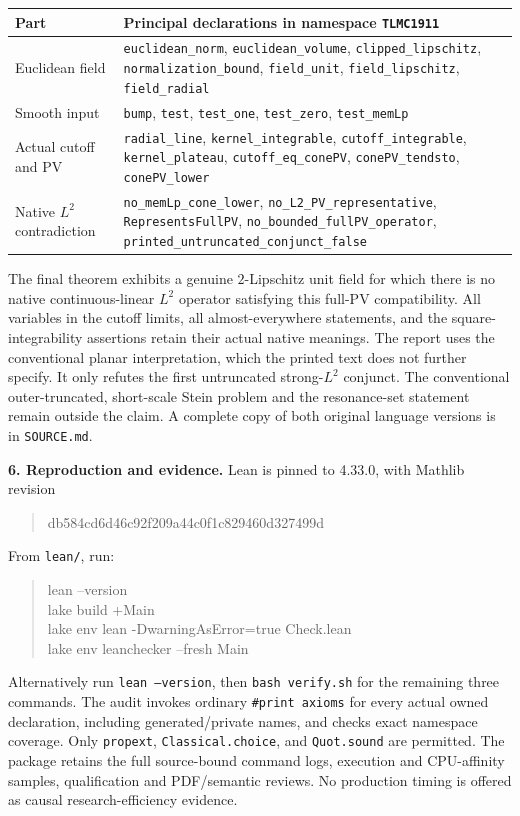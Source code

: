 \documentclass[10pt,a4paper]{article}
\begin{document}
\small
\begin{tabular}{@{}p{.28\linewidth}p{.67\linewidth}@{}}
\toprule
Part & Principal declarations in namespace \texttt{TLMC1911} \\
\midrule
Euclidean field & \texttt{euclidean\_norm}, \texttt{euclidean\_volume},
\texttt{clipped\_lipschitz}, \texttt{normalization\_bound},
\texttt{field\_unit}, \texttt{field\_lipschitz}, \texttt{field\_radial} \\
Smooth input & \texttt{bump}, \texttt{test}, \texttt{test\_one},
\texttt{test\_zero}, \texttt{test\_memLp} \\
Actual cutoff and PV & \texttt{radial\_line}, \texttt{kernel\_integrable},
\texttt{cutoff\_integrable}, \texttt{kernel\_plateau},
\texttt{cutoff\_eq\_conePV}, \texttt{conePV\_tendsto}, \texttt{conePV\_lower} \\
Native $L^2$ contradiction & \texttt{no\_memLp\_cone\_lower},
\texttt{no\_L2\_PV\_representative}, \texttt{RepresentsFullPV},
\texttt{no\_bounded\_fullPV\_operator},
\texttt{printed\_untruncated\_conjunct\_false} \\
\bottomrule
\end{tabular}
\normalsize

The final theorem exhibits a genuine $2$-Lipschitz unit field for which
there is no native continuous-linear $L^2$ operator satisfying this full-PV
compatibility. All variables in the cutoff limits, all almost-everywhere
statements, and the square-integrability assertions retain their actual
native meanings. The report uses the conventional planar interpretation,
which the printed text does not further specify. It only refutes the first
untruncated strong-$L^2$ conjunct. The conventional outer-truncated,
short-scale Stein problem and the resonance-set statement remain outside
the claim. A complete copy of both original language versions is in
\texttt{SOURCE.md}.

\textbf{6. Reproduction and evidence.}
Lean is pinned to 4.33.0, with Mathlib revision
\begin{quote}\ttfamily
db584cd6d46c92f209a44c0f1c829460d327499d
\end{quote}
From \texttt{lean/}, run:
\begin{quote}\ttfamily
lean --version\\
lake build +Main\\
lake env lean -DwarningAsError=true Check.lean\\
lake env leanchecker --fresh Main
\end{quote}
Alternatively run \texttt{lean --version}, then \texttt{bash verify.sh} for the
remaining three commands. The audit invokes ordinary \texttt{\#print axioms}
for every actual owned declaration, including generated/private names,
and checks exact namespace coverage. Only \texttt{propext},
\texttt{Classical.choice}, and \texttt{Quot.sound} are permitted.
The package retains the full source-bound command logs, execution and
CPU-affinity samples, qualification and PDF/semantic reviews.
No production timing is offered as causal research-efficiency evidence.
\end{document}
